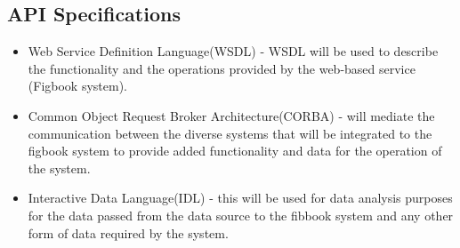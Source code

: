 \subsection{API Specifications}
\begin{itemize}
\item Web Service Definition Language(WSDL) - WSDL will be used to describe the functionality and the operations provided by the web-based service (Figbook system).
\item Common Object Request Broker Architecture(CORBA) - will mediate the communication between the diverse systems that will be integrated to the figbook system to provide added functionality and data for the operation of the system.
\item Interactive Data Language(IDL) - this will be used for data analysis purposes for the data passed from the data source to the fibbook system and any other form of data required by the system.
\end{itemize}
%